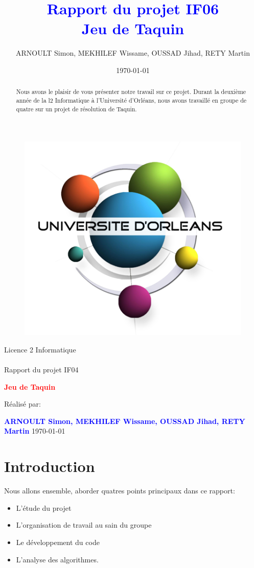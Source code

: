 ﻿\documentclass[a4paper,twoside,12pt]{report}
\title{\textcolor{blue}{\Large Rapport du projet IF06}\\\textcolor{blue}{\Large 
Jeu de Taquin}}
\author{ARNOULT Simon, MEKHILEF Wissame, OUSSAD Jihad, RETY Martin 
\date{\today}}
\begin{document}
%
\begin{figure}[H]
\includegraphics[width=0.2\linewidth]{Logo-univ-orleans.png}

\end{figure}
\vspace{2cm}
%
\begin{center}
{\Huge Licence 2 Informatique\\\ \\Rapport du projet IF04}
\par\vspace{1.4cm}

{\Huge\bf \textcolor{red}{\bf Jeu de Taquin}}
\par\vspace{1.6cm}

{\Large       Réalisé par:}
\par\vspace{1.3cm}
{\large\bf \textcolor{blue}{ARNOULT Simon, MEKHILEF Wissame, OUSSAD Jihad, RETY 
Martin}}
\vfill
\today
\end{center}
\pagestyle{fancy}

\begin{abstract}
%
Nous avons le plaisir de vous présenter notre travail sur ce projet. Durant la 
deuxième année de la l2 Informatique
à l'Université d'Orléans, nous avons travaillé en groupe de quatre sur un projet 
de résolution de Taquin.
\end{abstract}
 
\newpage
\tableofcontents
\listoffigures
\newpage

\chapter{Introduction}
Nous allons ensemble, aborder quatres points principaux dans ce rapport:
\begin{itemize}
\item L'étude du projet
\item L'organisation de travail au sain du groupe
\item Le développement du code
\item L'analyse des algorithmes.
\end{itemize}
%
\end{document}
